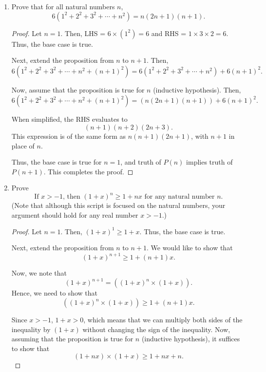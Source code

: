 \documentclass[11pt]{article}
\begin{document}
\begin{enumerate}



\item Prove that for all natural numbers $n$,   
\[
6\left( 1^2 + 2^2 + 3^2 + \dotsm + n^2\right)  =n(2n + 1)(n + 1).
\]

\begin{proof}
    Let $n = 1$. Then, LHS = $6 \times  (1^2) = 6$ and RHS = $1 \times 3 \times 2 = 6$. Thus, the base case is true.

    Next, extend the proposition from $n$ to $n+1$. Then,
    \[
        6\left(1^2 + 2^2 + 3^2 + \dotsm + n^2 + (n+1)^2\right) = 6\left(1^2 + 2^2 + 3^2 + \dotsm + n^2\right) + 6\left(n+1\right)^2.
    \]

    Now, assume that the proposition is true for $n$ (inductive hypothesis). Then,
    \[
        6\left(1^2 + 2^2 + 3^2 + \dotsm + n^2 + (n+1)^2\right) = \left(n(2n + 1)(n + 1)\right) + 6\left(n+1\right)^2.
    \]

    When simplified, the RHS evaluates to
    \[
        (n+1)(n+2)(2n+3).
    \]
    This expression is of the same form as $n(n+1)(2n+1)$, with $n+1$ in place of $n$. 
    
    Thus, the base case is true for $n=1$, and truth of $P(n)$ implies truth of $P(n+1)$. This completes the proof. \renewcommand\qedsymbol{QED}
    
\end{proof}


\item  Prove 
\[
\mbox{
If $x>-1$, then $(1+x)^n\geq 1+nx$ for any natural number $n$.}
\]
(Note that although this script is focused on the natural numbers, your argument should hold for any real number $x>-1.$)

\begin{proof}

Let $n = 1$. Then, $(1+x)^1 \geq 1+x$. Thus, the base case is true. 

Next, extend the proposition from $n$ to $n+1$. We would like to show that
\[
    (1+x)^ {n+1} \geq 1 + (n+1)x.
\]

Now, we note that
\[
    (1+x)^ {n+1} = \left((1+x)^n \times (1+x)\right).
\]
Hence, we need to show that
\[
    \left((1+x)^n \times (1+x)\right) \geq 1 + (n+1)x.
\]

Since $x> -1$, $1+x >0$, which means that we can multiply both sides of the inequality by $(1+x)$ without changing the sign of the inequality. Now, assuming that the proposition is true for $n$ (inductive hypothesis), it suffices to show that
\[
    (1 + nx) \times (1+x) \geq 1 + nx + n.
\]


\end{proof}
\end{enumerate}
\end{document}
